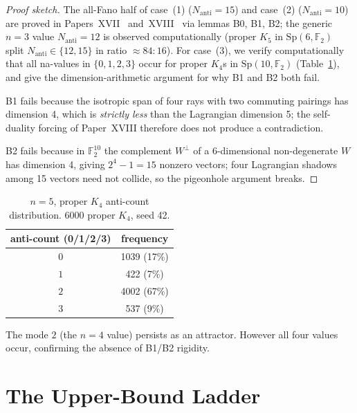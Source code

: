 \documentclass[11pt,a4paper]{article}
\theoremstyle{remark}
\newcommand{\Sp}{\mathrm{Sp}}
\newcommand{\Nanti}{N_{\mathrm{anti}}}
\begin{document}
\begin{proof}[Proof sketch]
The all-Fano half of case~(1) ($\Nanti=15$) and case~(2) ($\Nanti=10$) are proved in
Papers~XVII~\cite{PaperXVII} and~XVIII~\cite{PaperXVIII} via lemmas B0, B1, B2; the
generic $n=3$ value $\Nanti=12$ is observed computationally (proper $K_5$ in
$\Sp(6,\mathbb F_2)$ split $\Nanti\in\{12,15\}$ in ratio $\approx84{:}16$).
For case~(3), we verify computationally that all na-values in $\{0,1,2,3\}$ occur
for proper $K_4$s in $\Sp(10,\mathbb F_2)$ (Table~\ref{tab:k4landscape}), and give
the dimension-arithmetic argument for why B1 and B2 both fail.

B1 fails because the isotropic span of four rays with two commuting pairings has
dimension 4, which is \emph{strictly less} than the Lagrangian dimension 5; the
self-duality forcing of Paper~XVIII therefore does not produce a contradiction.

B2 fails because in $\mathbb F_2^{10}$ the complement $W^\perp$ of a 6-dimensional
non-degenerate $W$ has dimension 4, giving $2^4-1=15$ nonzero vectors; four
Lagrangian shadows among 15 vectors need not collide, so the pigeonhole argument
breaks.
\end{proof}

\begin{table}[H]
\centering
\caption{$n=5$, proper $K_4$ anti-count distribution. 6000 proper $K_4$, seed 42.}
\label{tab:k4landscape}
\begin{tabular}{cc}
\toprule
anti-count (0/1/2/3) & frequency \\
\midrule
$0$ & 1039 (17\%) \\
$1$ & 422 (7\%) \\
$2$ & 4002 (67\%) \\
$3$ & 537 (9\%) \\
\bottomrule
\end{tabular}
\end{table}

\noindent
The mode $2$ (the $n=4$ value) persists as an attractor.
However all four values occur, confirming the absence of B1/B2 rigidity.

\section{The Upper-Bound Ladder}\label{sec:upbound}
\end{document}
